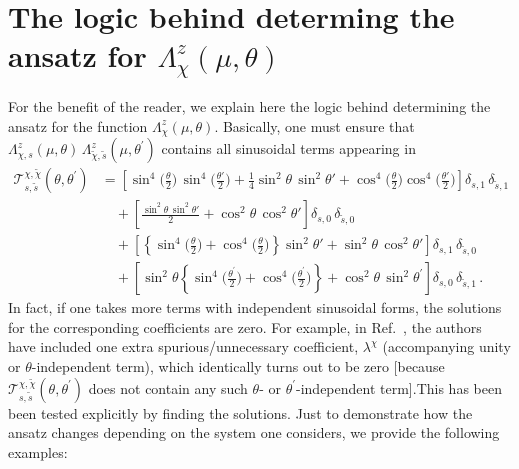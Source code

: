 \documentclass[aps,prb,onecolumn,nofootinbib,citeautoscript,10pt]{revtex4-2}
\def \nn{\nonumber \\}
\begin{document}
\section{The logic behind determing the ansatz for ${\Lambda}^z_\chi (\mu,\theta )$}
\label{appansatz}

For the benefit of the reader, we explain here the logic behind determining the ansatz for the function ${\Lambda}^z_\chi (\mu,\theta )$. Basically, one must ensure that $ {\Lambda}^z_{\chi, s} (\mu,\theta ) \,  {\Lambda}^z_{\tilde \chi, \tilde s} (\mu,\theta^\prime )$ contains all sinusoidal terms appearing in 
\begin{align}
{\mathcal T }^{\chi, \tilde \chi}_{ s, \tilde s} (\theta, \theta^\prime)
& = \left [
\sin ^4\bigg(\frac{\theta }{2}\bigg) \, \sin ^4\bigg (\frac{\theta '}{2}\bigg )
+\frac{1}{4} \sin ^2 \theta  \, \sin ^2 \theta'
+ \cos ^4\bigg(\frac{\theta }{2}\bigg ) \cos^4\bigg (\frac{\theta '}{2}\bigg )
\right ] \delta_{s,1} \, \delta_{\tilde s, 1}
 \nn & \quad 
+ \left [
\frac{ \sin ^2 \theta \, \sin ^2 \theta ' }{2} 
+\cos ^2 \theta \, \cos ^2 \theta '
\right ] \delta_{s,0} \, \delta_{\tilde s, 0}
\nn & \quad + \left [ 
\left\lbrace \sin ^4\bigg (\frac{\theta }{2}\bigg )
+ \cos ^4\bigg( \frac{\theta }{2}\bigg )
\right \rbrace \sin ^2 \theta '
+\sin ^2 \theta \, \cos ^2\theta '  \right ]   \delta_{s,1} \, \delta_{\tilde s, 0} 
\nn & \quad + \left [ 
 \sin ^2 \theta 
\left\lbrace \sin ^4\bigg (\frac{\theta^\prime }{2}\bigg )
+ \cos ^4 \bigg( \frac{\theta ^\prime}{2}\bigg )
\right \rbrace
+\cos ^2\theta \, \sin ^2 \theta^\prime  \right ]  
\delta_{s,0} \, \delta_{\tilde s, 1} \,.
\end{align}
In fact, if one takes more terms with independent sinusoidal forms, the solutions for the corresponding coefficients are zero. For example, in Ref.~\cite{girish-internode-spin1}, the authors have included one extra spurious/unnecessary coefficient, $\lambda^\chi $ (accompanying unity or $\theta$-independent term), which identically turns out to be zero [because ${\mathcal T }^{\chi, \tilde \chi}_{ s, \tilde s} (\theta, \theta^\prime)$ does not contain any such $\theta$- or $\theta^\prime $-independent term].This has been been tested explicitly by finding the solutions. Just to demonstrate how the ansatz changes depending on the system one considers, we provide the following examples:
\end{document}
